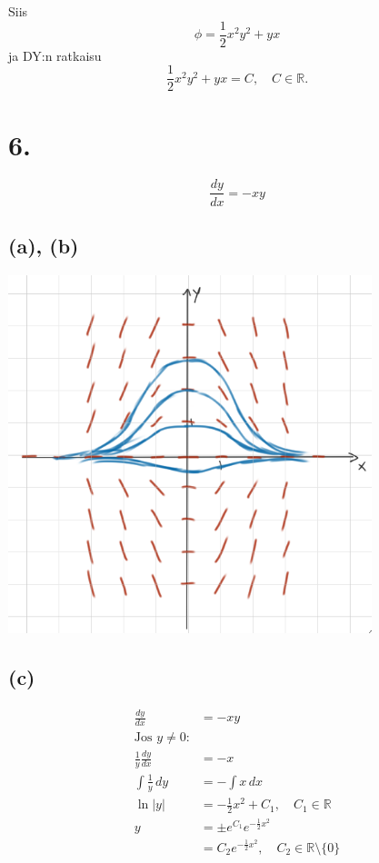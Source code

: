 \documentclass{article}
\begin{document}
Siis
\[
  \phi = \frac{1}{2}x^2y^2 + yx
\]
ja DY:n ratkaisu
\[
  \frac{1}{2}x^2y^2 + yx = C, \quad C \in \mathbb{R}.
\]

\section*{6.}

\[
  \frac{dy}{dx} = -xy
\]

\subsection*{(a), (b)}

\includegraphics*[width=300pt]{w3_6.png}

\subsection*{(c)}

\begin{align*}
  \frac{dy}{dx} &= -xy \\
  \text{Jos $y \neq 0$:} \\
  \frac{1}{y}\frac{dy}{dx} &= -x \\
  \int \frac{1}{y}\,dy &= -\int x\,dx \\
  \ln |y| &= -\frac{1}{2}x^2 + C_1, \quad C_1 \in \mathbb{R} \\
  y &= \pm e^{C_1}e^{-\frac{1}{2}x^2} \\
    &= C_2e^{-\frac{1}{2}x^2}, \quad C_2 \in \mathbb{R} \setminus \{0\} \\
\end{align*}
\end{document}
